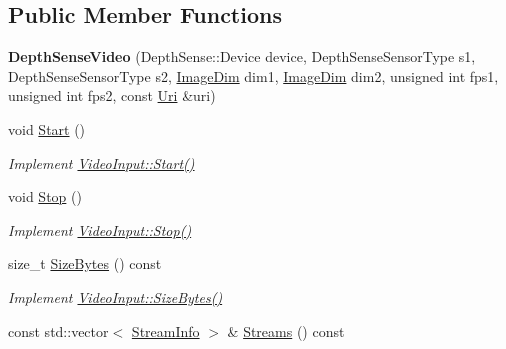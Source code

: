 \subsection*{Public Member Functions}
\begin{DoxyCompactItemize}
\item 
{\bfseries Depth\+Sense\+Video} (Depth\+Sense\+::\+Device device, Depth\+Sense\+Sensor\+Type s1, Depth\+Sense\+Sensor\+Type s2, \hyperlink{structpangolin_1_1_image_dim}{Image\+Dim} dim1, \hyperlink{structpangolin_1_1_image_dim}{Image\+Dim} dim2, unsigned int fps1, unsigned int fps2, const \hyperlink{classpangolin_1_1_uri}{Uri} \&uri)\hypertarget{classpangolin_1_1_depth_sense_video_a792a4261ff251550b93f6ed4d06642a3}{}\label{classpangolin_1_1_depth_sense_video_a792a4261ff251550b93f6ed4d06642a3}

\item 
void \hyperlink{classpangolin_1_1_depth_sense_video_a32952c0c71c897c25370843415853c7c}{Start} ()\hypertarget{classpangolin_1_1_depth_sense_video_a32952c0c71c897c25370843415853c7c}{}\label{classpangolin_1_1_depth_sense_video_a32952c0c71c897c25370843415853c7c}

\begin{DoxyCompactList}\small\item\em Implement \hyperlink{structpangolin_1_1_video_input_a74a2e3e1b87c7cbf9de9bcb39e1df128}{Video\+Input\+::\+Start()} \end{DoxyCompactList}\item 
void \hyperlink{classpangolin_1_1_depth_sense_video_aa5cc804ef512e4c22cccb856c85d5b26}{Stop} ()\hypertarget{classpangolin_1_1_depth_sense_video_aa5cc804ef512e4c22cccb856c85d5b26}{}\label{classpangolin_1_1_depth_sense_video_aa5cc804ef512e4c22cccb856c85d5b26}

\begin{DoxyCompactList}\small\item\em Implement \hyperlink{structpangolin_1_1_video_input_a8945f80194cc7ec9594db7f27e7d09b8}{Video\+Input\+::\+Stop()} \end{DoxyCompactList}\item 
size\+\_\+t \hyperlink{classpangolin_1_1_depth_sense_video_acdb3864c713fe0c6ba69b70a2f0bd770}{Size\+Bytes} () const \hypertarget{classpangolin_1_1_depth_sense_video_acdb3864c713fe0c6ba69b70a2f0bd770}{}\label{classpangolin_1_1_depth_sense_video_acdb3864c713fe0c6ba69b70a2f0bd770}

\begin{DoxyCompactList}\small\item\em Implement \hyperlink{structpangolin_1_1_video_input_a93cee5c33386973a2a51165e6bdcf40b}{Video\+Input\+::\+Size\+Bytes()} \end{DoxyCompactList}\item 
const std\+::vector$<$ \hyperlink{classpangolin_1_1_stream_info}{Stream\+Info} $>$ \& \hyperlink{classpangolin_1_1_depth_sense_video_a6a404f7d4cff4ce2a47f9140b2f2d080}{Streams} () const \hypertarget{classpangolin_1_1_depth_sense_video_a6a404f7d4cff4ce2a47f9140b2f2d080}{}\label{classpangolin_1_1_depth_sense_video_a6a404f7d4cff4ce2a47f9140b2f2d080}


\end{DoxyCompactItemize}
